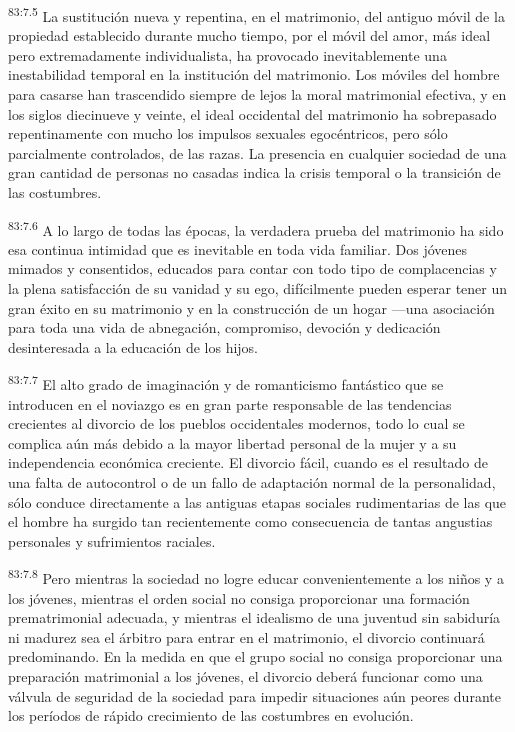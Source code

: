 \documentclass[twoside, 11pt]{book}
\begin{document}
\par
\textsuperscript{83:7.5} La sustitución nueva y repentina, en el matrimonio, del antiguo móvil de la propiedad establecido durante mucho tiempo, por el móvil del amor, más ideal pero extremadamente individualista, ha provocado inevitablemente una inestabilidad temporal en la institución del matrimonio. Los móviles del hombre para casarse han trascendido siempre de lejos la moral matrimonial efectiva, y en los siglos diecinueve y veinte, el ideal occidental del matrimonio ha sobrepasado repentinamente con mucho los impulsos sexuales egocéntricos, pero sólo parcialmente controlados, de las razas. La presencia en cualquier sociedad de una gran cantidad de personas no casadas indica la crisis temporal o la transición de las costumbres.

\par
\textsuperscript{83:7.6} A lo largo de todas las épocas, la verdadera prueba del matrimonio ha sido esa continua intimidad que es inevitable en toda vida familiar. Dos jóvenes mimados y consentidos, educados para contar con todo tipo de complacencias y la plena satisfacción de su vanidad y su ego, difícilmente pueden esperar tener un gran éxito en su matrimonio y en la construcción de un hogar ---una asociación para toda una vida de abnegación, compromiso, devoción y dedicación desinteresada a la educación de los hijos.

\par
\textsuperscript{83:7.7} El alto grado de imaginación y de romanticismo fantástico que se introducen en el noviazgo es en gran parte responsable de las tendencias crecientes al divorcio de los pueblos occidentales modernos, todo lo cual se complica aún más debido a la mayor libertad personal de la mujer y a su independencia económica creciente. El divorcio fácil, cuando es el resultado de una falta de autocontrol o de un fallo de adaptación normal de la personalidad, sólo conduce directamente a las antiguas etapas sociales rudimentarias de las que el hombre ha surgido tan recientemente como consecuencia de tantas angustias personales y sufrimientos raciales.

\par
\textsuperscript{83:7.8} Pero mientras la sociedad no logre educar convenientemente a los niños y a los jóvenes, mientras el orden social no consiga proporcionar una formación prematrimonial adecuada, y mientras el idealismo de una juventud sin sabiduría ni madurez sea el árbitro para entrar en el matrimonio, el divorcio continuará predominando. En la medida en que el grupo social no consiga proporcionar una preparación matrimonial a los jóvenes, el divorcio deberá funcionar como una válvula de seguridad de la sociedad para impedir situaciones aún peores durante los períodos de rápido crecimiento de las costumbres en evolución.
\end{document}
